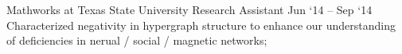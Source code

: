 \experience
    {Mathworks at Texas State University}
    {Research Assistant}
    {Jun `14 -- Sep `14}
    {
        Characterized negativity in hypergraph structure to enhance our understanding of
        deficiencies in nerual / social / magnetic networks;
    }
